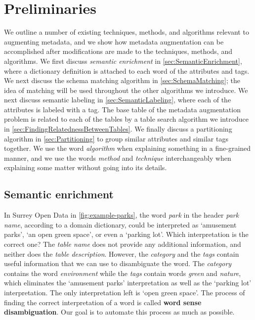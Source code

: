
\chapter{Preliminaries}
\label{ch:Preliminaries}

We outline a number of existing techniques, methods, and algorithms relevant to augmenting metadata, and we show how metadata augmentation can be accomplished after modifications are made to the techniques, methods, and algorithms. We first discuss \textit{semantic enrichment} in \autoref{sec:SemanticEnrichment}, where a dictionary definition is attached to each word of the attributes and tags. We next discuss the schema matching algorithm in \autoref{sec:SchemaMatching}; the idea of matching will be used throughout the other algorithms we introduce. We next discuss semantic labeling in \autoref{sec:SemanticLabeling}, where each of the attributes is labeled with a tag. The base table of the metadata augmentation problem is related to each of the tables by a table search algorithm we introduce in \autoref{sec:FindingRelatednessBetweenTables}. We finally discuss a partitioning algorithm in \autoref{sec:Partitioning} to group similar attributes and similar tags together. We use the word \textit{algorithm} when explaining something in a fine-grained manner, and we use the words \textit{method} and \textit{technique} interchangeably when explaining some matter without going into its details.

\section{Semantic enrichment}
\label{sec:SemanticEnrichment}

In Surrey Open Data in \autoref{fig:example-parks}, the word \textit{park} in the header \textit{park name}, according to a domain dictionary, could be interpreted as `amusement parks', `an open green space', or even a `parking lot'. Which interpretation is the correct one? The \textit{table name} does not provide any additional information, and neither does the \textit{table description}. However, the \textit{category} and the \textit{tags} contain useful information that we can use to disambiguate the word. The \textit{category} contains the word \textit{environment} while the \textit{tags} contain words \textit{green} and \textit{nature}, which eliminates the `amusement parks' interpretation as well as the `parking lot' interpretation. The only interpretation left is `open green space'. The process of finding the correct interpretation of a word is called \textbf{\gls{word sense disambiguation}}. Our goal is to automate this process as much as possible.

